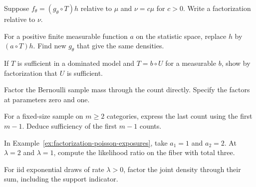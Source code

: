 \documentclass[11pt,oneside]{book}
\theoremstyle{definition}
\theoremstyle{remark}
\begin{document}
\begin{practiceexercise}
\label{pex:factorization-reference-rescaling}
Suppose $f_\theta=(g_\theta\circ T)h$ relative to $\mu$ and
$\nu=c\mu$ for $c>0$. Write a factorization relative to $\nu$.
\end{practiceexercise}

\begin{practiceexercise}
\label{pex:factorization-positive-rescaling}
For a positive finite measurable function $a$ on the statistic
space, replace $h$ by $(a\circ T)h$. Find new $g_\theta$ that
give the same densities.
\end{practiceexercise}

\begin{practiceexercise}
\label{pex:factorization-refinement}
If $T$ is sufficient in a dominated model and $T=b\circ U$
for a measurable $b$, show by factorization that $U$ is sufficient.
\end{practiceexercise}

\begin{practiceexercise}
\label{pex:factorization-bernoulli-count}
Factor the Bernoulli sample mass through the count directly.
Specify the factors at parameters zero and one.
\end{practiceexercise}

\begin{practiceexercise}
\label{pex:factorization-one-count-redundant}
For a fixed-size sample on $m\geq2$ categories, express the
last count using the first $m-1$. Deduce sufficiency of the
first $m-1$ counts.
\end{practiceexercise}

\begin{practiceexercise}
\label{pex:factorization-poisson-two-exposures}
In Example~\ref{ex:factorization-poisson-exposures}, take
$a_1=1$ and $a_2=2$. At $\lambda=2$ and $\lambda=1$, compute
the likelihood ratio on the fiber with total three.
\end{practiceexercise}

\begin{practiceexercise}
\label{pex:factorization-exponential-total}
For iid exponential draws of rate $\lambda>0$, factor the
joint density through their sum, including the support indicator.
\end{practiceexercise}
\end{document}
